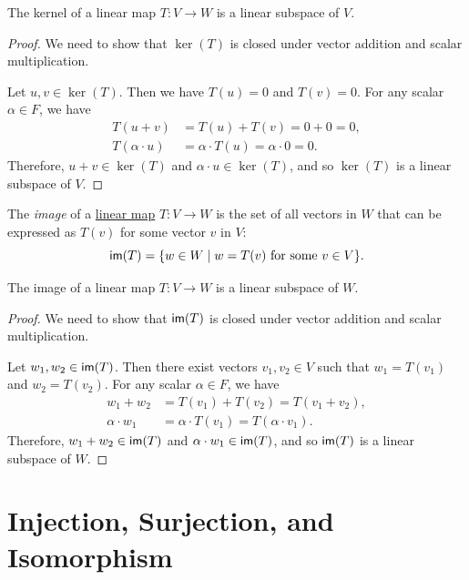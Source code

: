 \begin{proposition}
  The kernel of a linear map $T \colon V \to W$ is a linear subspace of $V$.
\end{proposition}
\begin{proof}
  We need to show that $\ker(T)$ is closed under vector addition and scalar multiplication.

  Let $u, v \in \ker(T)$. Then we have $T(u) = 0$ and $T(v) = 0$. For any scalar $\alpha \in F$, we have
  \begin{align*}
    T(u + v)          & = T(u) + T(v) = 0 + 0 = 0,                \\
    T(\alpha \cdot u) & = \alpha \cdot T(u) = \alpha \cdot 0 = 0.
  \end{align*}
  Therefore, $u + v \in \ker(T)$ and $\alpha \cdot u \in \ker(T)$, and so $\ker(T)$ is a linear subspace of $V$.
\end{proof}

\begin{definition}[Image]\label{def:image}
  The \emph{image} of a \hyperref[def:linear_map]{linear map} $T \colon V \to W$ is the set of all vectors in $W$ that can be expressed as $T(v)$ for some vector $v$ in $V$:
  \[
    \operatorname{\text{\normalfont\sffamily im}}(T) = \{ w \in W \mid w = T(v) \text{ for some } v \in V \}.
  \]
\end{definition}

\begin{proposition}
  The image of a linear map $T \colon V \to W$ is a linear subspace of $W$.
\end{proposition}
\begin{proof}
  We need to show that $\operatorname{\text{\normalfont\sffamily im}}(T)$ is closed under vector addition and scalar multiplication.

  Let $w_1, w_2 \in \operatorname{\text{\normalfont\sffamily im}}(T)$. Then there exist vectors $v_1, v_2 \in V$ such that $w_1 = T(v_1)$ and $w_2 = T(v_2)$. For any scalar $\alpha \in F$, we have
  \begin{align*}
    w_1 + w_2        & = T(v_1) + T(v_2) = T(v_1 + v_2),            \\
    \alpha \cdot w_1 & = \alpha \cdot T(v_1) = T(\alpha \cdot v_1).
  \end{align*}
  Therefore, $w_1 + w_2 \in \operatorname{\text{\normalfont\sffamily im}}(T)$ and $\alpha \cdot w_1 \in \operatorname{\text{\normalfont\sffamily im}}(T)$, and so $\operatorname{\text{\normalfont\sffamily im}}(T)$ is a linear subspace of $W$.
\end{proof}

\section{Injection, Surjection, and Isomorphism}

